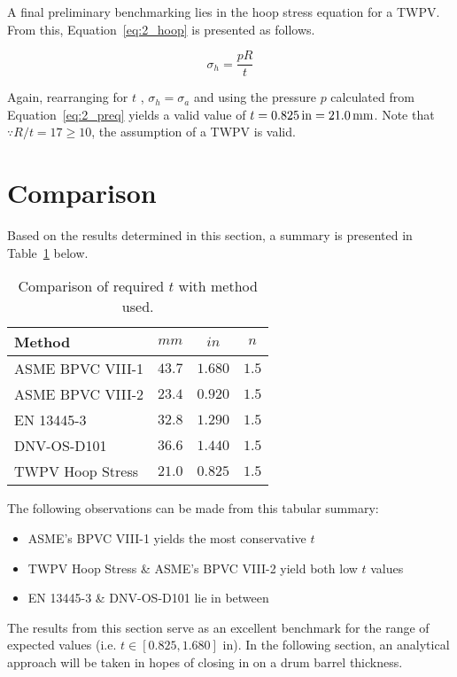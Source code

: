 A final preliminary benchmarking lies in the hoop stress equation \cite{roarks} for a TWPV. From this, Equation~\ref{eq:2_hoop} is presented as follows.

\begin{equation}
	\label{eq:2_hoop}
	\sigma_h = \frac{pR}{t}
\end{equation}

Again, rearranging for $t$ , $\sigma_h=\sigma_a$ and using the pressure $p$ calculated from Equation~\ref{eq:2_preq} yields a valid value of $t =0.825 \,\mathrm{in}=21.0\,\mathrm{mm}$. Note that $\because R/t = 17 \geq 10$, the assumption of a TWPV is valid.

\section{Comparison}

Based on the results determined in this section, a summary is presented in Table~\ref{table:2_comp} below.
\begin{table}[H]
	\centering
	\caption{Comparison of required $t$ with method used.}
	\begin{tabular}{lccc}
		\textbf{Method}  & \textbf{$mm$} & \textbf{$in$} & \textbf{$n$} \\
		\midrule
		ASME BPVC VIII-1 & $43.7$                 & $1.680$                & $1.5$       \\
		ASME BPVC VIII-2 & $23.4$                 & $0.920$                & $1.5$       \\
		EN 13445-3       & $32.8$                 & $1.290$                & $1.5$       \\    
		DNV-OS-D101      & $36.6$                 & $1.440$                & $1.5$       \\
		TWPV Hoop Stress & $21.0$                 & $0.825$                & $1.5$       \\
	\end{tabular}%
	\label{table:2_comp}%
\end{table}%

The following observations can be made from this tabular summary:
\begin{itemize}
	\item ASME's BPVC VIII-1 yields the most conservative $t$
	\item TWPV Hoop Stress \& ASME's BPVC VIII-2 yield both low $t$ values 
	\item EN 13445-3 \& DNV-OS-D101 lie in between \\
\end{itemize}

The results from this section serve as an excellent benchmark for the range of expected values (i.e. $t\in[0.825,1.680]$ in). In the following section, an analytical approach will be taken in hopes of closing in on a drum barrel thickness.